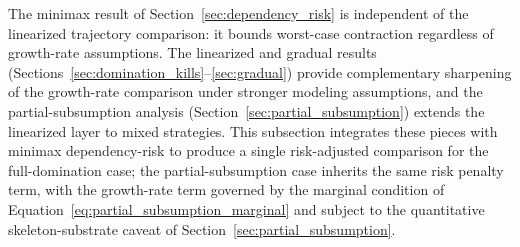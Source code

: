 The minimax result of Section~\ref{sec:dependency_risk} is independent of
the linearized trajectory comparison: it bounds worst-case contraction
regardless of growth-rate assumptions. The linearized and gradual results
(Sections~\ref{sec:domination_kills}--\ref{sec:gradual}) provide
complementary sharpening of the growth-rate comparison under stronger
modeling assumptions, and the partial-subsumption analysis
(Section~\ref{sec:partial_subsumption}) extends the linearized layer
to mixed strategies. This subsection integrates these pieces with
minimax dependency-risk to produce a single risk-adjusted comparison
for the full-domination case; the partial-subsumption case inherits
the same risk penalty term, with the growth-rate term governed by
the marginal condition of
Equation~\eqref{eq:partial_subsumption_marginal} and subject to the
quantitative skeleton-substrate caveat of
Section~\ref{sec:partial_subsumption}.

